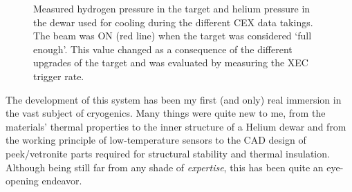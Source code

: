 \begin{refsection}
\begin{figure}[ht]
        \caption[CEX: Hydrogen pressure and duty cycle in 2021/2022/2023]{Measured hydrogen pressure in the target and helium pressure in the dewar used for cooling during the different CEX data takings. 
        The beam was ON (red line) when the target was considered `full enough'. This value changed as a consequence of the different upgrades of the target and was evaluated by measuring the XEC trigger rate.}
        \label{fig:CEX:datataking}
    \end{figure}

    \noindent
    The development of this system has been my first (and only) real immersion in the vast subject of cryogenics. 
    Many things were quite new to me, from the materials' thermal properties to the inner structure of a Helium dewar and from the working principle of low-temperature sensors to the CAD design of peek/vetronite parts required for structural stability and thermal insulation.
    Although being still far from any shade of \textit{expertise}, this has been quite an eye-opening endeavor.
    
\printbibliography[
    heading = bibliographychapter,
    title=Bibliography on \ce{LH2}
]

\end{refsection}
